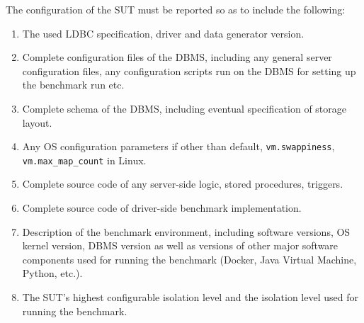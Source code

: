 The configuration of the SUT must be reported so as to include the following:
\begin{enumerate}
    \item The used LDBC specification, driver and data generator version.
    \item Complete configuration files of the DBMS, including any general server configuration files, any configuration scripts run on the DBMS for setting up the benchmark run etc.
    \item Complete schema of the DBMS, including eventual specification of storage layout.
    \item Any OS configuration parameters if other than default, \eg \verb+vm.swappiness+, \verb+vm.max_map_count+ in Linux.
    \item Complete source code of any server-side logic, \eg stored procedures, triggers.
    \item Complete source code of driver-side benchmark implementation.
    \item Description of the benchmark environment, including software versions, OS kernel version, DBMS version as well as versions of other major software components used for running the benchmark (Docker, Java Virtual Machine, Python, etc.).
    \item The SUT's highest configurable isolation level and the isolation level used for running the benchmark.
\end{enumerate}


